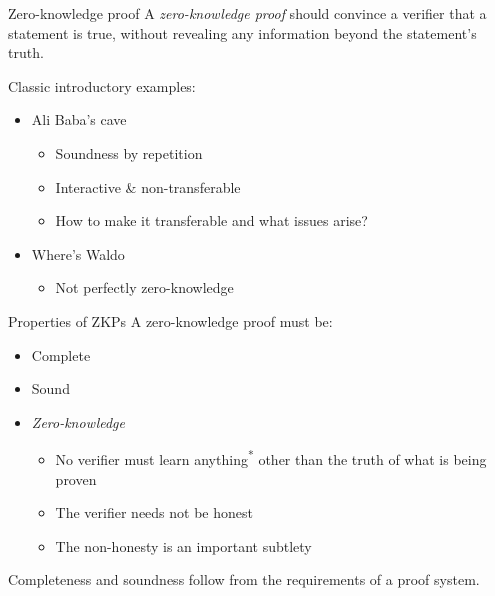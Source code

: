 \begin{frame}{Zero-knowledge proof}
  A \emph{zero-knowledge proof} should convince a verifier that a statement is true, without revealing any information beyond the statement's truth.

  \vspace*{1em}

  \pause
  Classic introductory examples:
  \begin{itemize}[<+(1)->]
    \item Ali Baba's cave
    \begin{itemize}
      \item Soundness by repetition
      \item Interactive \& non-transferable
      \item How to make it transferable and what issues arise?
    \end{itemize}
    \item Where's Waldo
    \begin{itemize}
      \item Not perfectly zero-knowledge
    \end{itemize}
  \end{itemize}
\end{frame}

\begin{frame}{Properties of ZKPs}
  A zero-knowledge proof must be:
  \begin{itemize}[<+(1)->]
    \item Complete
    \item Sound
    \item \emph{Zero-knowledge}
    \begin{itemize}
      \item No verifier must learn anything\textsuperscript{*} other than the truth of what is being proven
      \item The verifier needs not be honest
      \item The non-honesty is an important subtlety
    \end{itemize}
  \end{itemize}

  \pause
  Completeness and soundness follow from the requirements of a proof system.
\end{frame}

